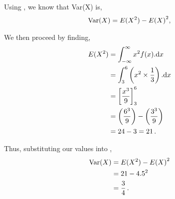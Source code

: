\begin{subquestions}
\begin{subsubquestions}
\subsubquestion

Using , we know that Var(X) is,
\begin{align}
	\text{Var}(X) & = E(X^2) - {E(X)}^2, \nonumber \\ \label{2010:q3:Var}
\end{align}

We then proceed by finding,
\begin{align}
	E(X^2)& = \int_{-\infty}^{\infty}x^2 f(x).\mathrm{d}x \nonumber \\
	& = \int_{3}^{6} \left( x^2 \times \frac{1}{3} \right).\mathrm{d}x \nonumber \\
	& = \left[\frac{x^3}{9} \right]^{6}_{3} \nonumber \\
	& = \left( \frac{6^3}{9} \right) - \left( \frac{3^3}{9} \right) \nonumber \\
	& = 24 -3=21 \,.
\end{align}

Thus, substituting our values into ,
\begin{align}
\text{Var}(X) & = E(X^2) - {E(X)}^2 \nonumber \\
& = 21 - 4.5^2 \nonumber \\
& = \frac{3}{4} \,.
\end{align}

\end{subsubquestions}

\end{subquestions}